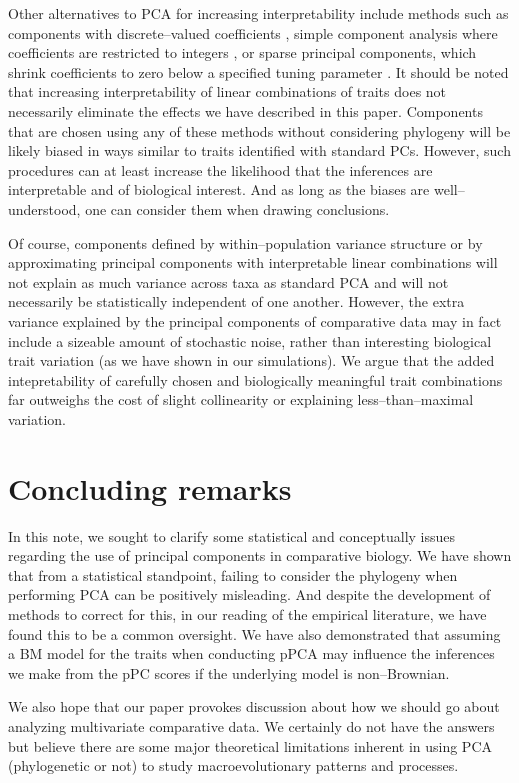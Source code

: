 \documentclass[a4paper,12pt]{article}
\begin{document}
Other alternatives to PCA for increasing interpretability include methods such as components with discrete--valued coefficients \citep{Hausman1982}, simple component analysis where coefficients are restricted to integers \citep{Vines2000}, or sparse principal components, which shrink coefficients to zero below a specified tuning parameter \citep{Jolliffe2002, Zou2006}. It should be noted that increasing interpretability of linear combinations of traits does not necessarily eliminate the effects we have described in this paper. Components that are chosen using any of these methods without considering phylogeny will be likely biased in ways similar to traits identified with standard PCs. However, such procedures can at least increase the likelihood that the inferences are interpretable and of biological interest. And as long as the biases are well--understood, one can consider them when drawing conclusions.  

Of course, components defined by within--population variance structure or by approximating principal components with interpretable linear combinations will not explain as much variance across taxa as standard PCA and will not necessarily be statistically independent of one another. However, the extra variance explained by the principal components of comparative data may in fact include a sizeable amount of stochastic noise, rather than interesting biological trait variation (as we have shown in our simulations). We argue that the added intepretability of carefully chosen and biologically meaningful trait combinations far outweighs the cost of slight collinearity or explaining less--than--maximal variation.

\section{Concluding remarks}
In this note, we sought to clarify some statistical and conceptually issues regarding the use of principal components in comparative biology. We have shown that from a statistical standpoint, failing to consider the phylogeny when performing PCA can be positively misleading. And despite the development of methods to correct for this, in our reading of the empirical literature, we have found this to be a common oversight. We have also demonstrated that assuming a BM model for the traits when conducting pPCA may influence the inferences we make from the pPC scores if the underlying model is non--Brownian. 

We also hope that our paper provokes discussion about how we should go about analyzing multivariate comparative data. We certainly do not have the answers but believe there are some major theoretical limitations inherent in using PCA (phylogenetic or not) to study macroevolutionary patterns and processes.  
\end{document}
